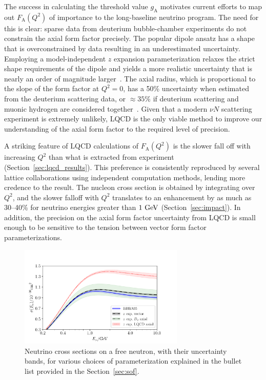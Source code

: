 \documentclass{ar-1col}
\begin{document}
The success in calculating the threshold value $g_{\mathrm{A}}$ motivates current efforts
to map out $F_{\mathrm{A}}(Q^2)$ of importance to the long-baseline neutrino program.
The need for this is clear: sparse data from deuterium bubble-chamber experiments do not constrain
the axial form factor precisely.
The popular dipole ansatz has a shape that
is overconstrained by data resulting in an underestimated uncertainty.
Employing a model-independent $z$ expansion parameterization
relaxes the strict shape requirements of the dipole and yields
a more realistic uncertainty that is nearly an order of magnitude larger~\cite{Meyer:2016oeg}.
The axial radius, which is proportional to the slope of the form factor at $Q^2=0$,
has a 50\% uncertainty when estimated from the deuterium scattering data,
or $\approx35\%$ if deuterium scattering and muonic hydrogen are considered
together~\cite{Hill:2017wgb}.
Given that a modern $\nu N$ scattering experiment is extremely unlikely, LQCD is the only viable method to improve our understanding of the axial form factor to the required level of precision.


A striking feature of LQCD calculations of $F_{\mathrm{A}}(Q^2)$
is the slower fall off with increasing $Q^2$ than what is extracted from experiment (Section~\ref{sec:lqcd_results}).
This preference is consistently reproduced by several lattice collaborations using
independent computation methods, lending more credence to the result.
The nucleon cross section is obtained by integrating over $Q^2$, and the slower falloff with $Q^2$
translates to an enhancement
by as much as 30--40\%
for neutrino energies greater than $1~{\rm GeV}$ (Section~\ref{sec:impact}).
In addition, the precision on the axial form factor uncertainty from LQCD
is small enough to be sensitive to the tension between vector form factor parameterizations.


\begin{figure}%
 \centering
 \includegraphics[width=0.7\textwidth]{plots/xsec_comparison-standalone.pdf}\vspace{4pt}
\caption{
 Neutrino cross sections on a free neutron, with their uncertainty bands,
 for various choices of parameterization explained in the bullet list provided in the Section~\ref{sec:sof}.
 \label{fig:nucleonxsec}
}
\end{figure}
\end{document}
